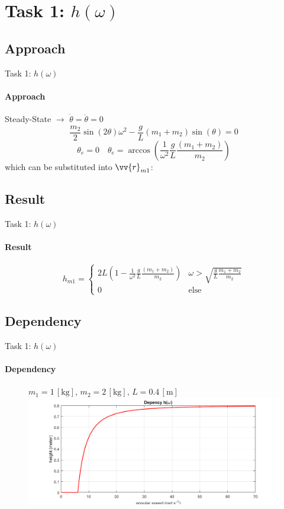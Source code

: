 \section{Task 1: $h(\omega)$}
\subsection{Approach}
\begin{frame}{Task 1: $h(\omega)$}
	\framesubtitle{Approach}
	\centering Steady-State $\rightarrow$ $\dot{\theta} = \ddot{\theta} = 0$\\
	\begin{equation*}
		\frac{m_2}{2}\sin(2\theta)\omega^2 - \frac{g}{L}(m_1+m_2) \sin(\theta) = 0
	\end{equation*}
	\begin{equation*}
	\theta_e = 0 \quad \theta_e = \arccos\left(\frac{1}{\omega^2}\frac{g}{L}\frac{(m_1+m_2)}{m_2}\right)
	\end{equation*}
	\centering which can be substituted into $\vv{r}_{m1}$:
\end{frame}

\subsection{Result}
\begin{frame}{Task 1: $h(\omega)$}
	\framesubtitle{Result}
		\begin{figure}[H]
			\begin{equation*}
			h_{m1} = \begin{cases} 2L\left(1-\frac{1}{\omega^2}\frac{g}{L}\frac{(m_1+m_2)}{m_2}\right) & \omega > \sqrt{\frac{g}{L} \frac{m_1+m_2}{m_2}} \\ 0 & \text{else} \end{cases}
			\end{equation*}

		\end{figure}
\end{frame}

\subsection{Dependency}
\begin{frame}{Task 1: $h(\omega)$}
	\framesubtitle{Dependency}
	\begin{figure}[H]
		\centering
		$m_1 = 1\,\left[\mathrm{kg}\right]$, $m_2 = 2\,\left[\mathrm{kg}\right]$, $L = 0.4\,\left[\mathrm{m}\right]$\\
		\includegraphics[width=1\textwidth]{pics/height.png}
	\end{figure}
\end{frame}



